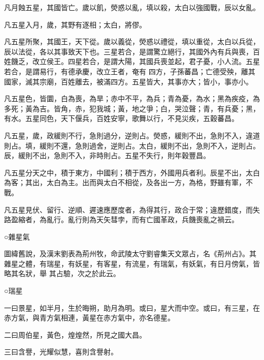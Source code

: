 \begin{pinyinscope}
 凡月蝕五星，其國皆亡。歲以飢，熒惑以亂，填以殺，太白以強國戰，辰以女亂。



 凡五星入月，歲，其野有逐相；太白，將僇。



 凡五星所聚，其國王，天下從。歲以義從，熒惑以禮從，填以重從，太白以兵從，辰以法從，各以其事致天下也。三星若合，是謂驚立絕行，其國外內有兵與喪，百姓饑乏，改立侯王。四星若合，是謂大陽，其國兵喪並起，君子憂，小人流。五星若合，是謂易行，有德承慶，改立王者，奄有
 四方，子孫蕃昌；亡德受殃，離其國家，滅其宗廟，百姓離去，被滿四方。五星皆大，其事亦大；皆小，事亦小。



 凡五星色，皆圜，白為喪，為旱；赤中不平，為兵；青為憂，為水；黑為疾疫，為多死；黃為吉。皆角，赤，犯我城；黃，地之爭；白，哭泣聲；青，有兵憂；黑，有水。五星同色，天下偃兵，百姓安寧，歌舞以行，不見災疾，五穀蕃昌。



 凡五星，歲，政緩則不行，急則過分，逆則占。熒惑，緩則不出，急則不入，違道則占。填，緩則不還，急則過舍，逆則占。太白，緩則不出，急則不入，逆則占。辰，緩則不出，急則不入，非時則占。五星不失行，則年穀豐昌。



 凡五星分天之中，積于東方，中國利；積于西方，外國用兵者利。辰星不出，太白為客；其出，太白為主。出而與太白不相從，及各出一方，為格，野雖有軍，不戰。



 凡五星見伏、留行、逆順、遲速應歷度者，為得其行，政合于常；違歷錯度，而失路盈縮者，為亂行。亂行則為天矢彗孛，而有亡國革政，兵饑喪亂之禍云。



 ○雜星氣



 圖緯舊說，及漢末劉表為荊州牧，命武陵太守劉睿集天文眾占，名《荊州占》。其雜星之體，有瑞星，有妖星，有客星，有流星，有瑞氣，有妖氣，有日月傍氣，皆略其名狀，舉
 其占驗，次之於此云。



 ○瑞星



 一曰景星，如半月，生於晦朔，助月為明。或曰，星大而中空。或曰，有三星，在赤方氣，與青方氣相連，黃星在赤方氣中，亦名德星。



 二曰周伯星，黃色，煌煌然，所見之國大昌。



 三曰含譽，光耀似慧，喜則含譽射。




\end{pinyinscope}
